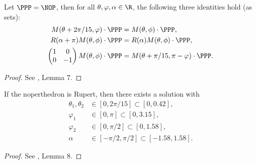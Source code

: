 \begin{lemma} \label{lem:symmetries}
\leanok
{}
Let $\PPP = \NOP$, then for all $\theta, \varphi, \alpha \in \R$, the following three identities hold (as sets):
\begin{align*}
    M({\theta+2\pi/15,\varphi})\cdot \PPP &=M(\theta, \phi) \cdot \PPP,\\
    R(\alpha+\pi)M(\theta, \phi) \cdot \PPP &=R(\alpha)M(\theta, \phi) \cdot \PPP,\\
    \begin{pmatrix}
        1&0\\
        0&-1
    \end{pmatrix}
    M(\theta, \phi) \cdot \PPP&=
    M({\theta+\pi/15,\pi-\varphi}) \cdot \PPP.
\end{align*}
\end{lemma}
\begin{proof}
\leanok
See \cite{polyhedron.without.rupert}, Lemma 7.
\end{proof}


\begin{corollary}
\label{cor:rupert_tightening}
\leanok
If the noperthedron is Rupert, then there exists a solution with
\begin{align*}
\theta_1,\theta_2&\in[0,2\pi/15] \subset [0,0.42], \\
\varphi_1&\in [0,\pi] \subset [0,3.15],\\
\varphi_2&\in [0,\pi/2] \subset [0,1.58],\\
\alpha &\in [-\pi/2,\pi/2] \subset [-1.58,1.58].
\end{align*}
\end{corollary}

\begin{proof}
\leanok
See \cite{polyhedron.without.rupert}, Lemma 8.
\end{proof}
